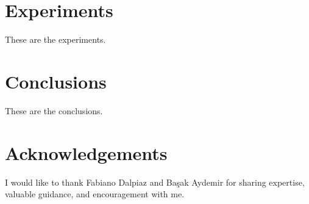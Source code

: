 \documentclass{article}
\begin{document}
\section{Experiments}

These are the experiments.

\section{Conclusions}

These are the conclusions.

\section{Acknowledgements}

I would like to thank Fabiano Dalpiaz and Ba\c sak Aydemir for sharing expertise, valuable guidance, and encouragement with me.

\printbibliography
\end{document}
